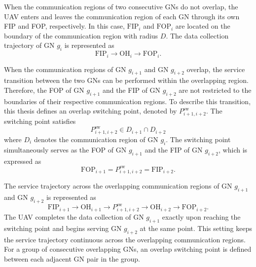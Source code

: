 \documentclass[12pt]{ksthesis}
\begin{document}
\begin{thesis}
{    When the communication regions of two consecutive GNs do not overlap, the UAV enters and leaves the communication region of each GN through its own FIP and FOP, respectively. In this case, \(\mathrm{FIP}_i\) and \(\mathrm{FOP}_i\) are located on the boundary of the communication region with radius \(D\). The data collection trajectory of GN \(g_i\) is represented as
    \begin{equation}
        \mathrm{FIP}_i \rightarrow \mathrm{OH}_i \rightarrow \mathrm{FOP}_i.
    \end{equation}

    When the communication regions of GN \(g_{i+1}\) and GN \(g_{i+2}\) overlap, the service transition between the two GNs can be performed within the overlapping region. Therefore, the FOP of GN \(g_{i+1}\) and the FIP of GN \(g_{i+2}\) are not restricted to the boundaries of their respective communication regions. To describe this transition, this thesis defines an overlap switching point, denoted by \(P^{\mathrm{sw}}_{i+1,i+2}\). The switching point satisfies
    \begin{equation}
        P^{\mathrm{sw}}_{i+1,i+2} \in D_{i+1} \cap D_{i+2}
    \end{equation}
    where \(D_i\) denotes the communication region of GN \(g_i\). The switching point simultaneously serves as the FOP of GN \(g_{i+1}\) and the FIP of GN \(g_{i+2}\), which is expressed as
    \begin{equation}
        \mathrm{FOP}_{i+1}=P^{\mathrm{sw}}_{i+1,i+2}=\mathrm{FIP}_{i+2}.
    \end{equation}

    The service trajectory across the overlapping communication regions of GN \(g_{i+1}\) and GN \(g_{i+2}\) is represented as
    \begin{equation}
        \mathrm{FIP}_{i+1} \rightarrow \mathrm{OH}_{i+1} \rightarrow P^{\mathrm{sw}}_{i+1,i+2} \rightarrow \mathrm{OH}_{i+2} \rightarrow \mathrm{FOP}_{i+2}.
    \end{equation} 
    The UAV completes the data collection of GN \(g_{i+1}\) exactly upon reaching the switching point and begins serving GN \(g_{i+2}\) at the same point. This setting keeps the service trajectory continuous across the overlapping communication regions. For a group of consecutive overlapping GNs, an overlap switching point is defined between each adjacent GN pair in the group.

}
\end{thesis}
\end{document}
